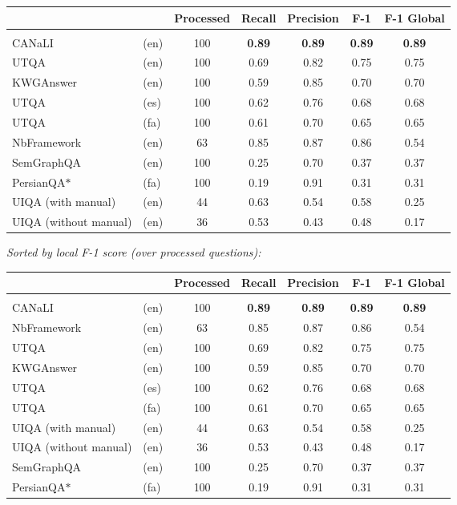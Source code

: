 \documentclass{article}
\begin{document}
\begin{tabular}{llccccc}
& & Processed & Recall & Precision & F-1 & F-1 Global \\
\hline \\[1ex]
CANaLI      & (en) & 100 & \textbf{0.89} & \textbf{0.89} & \textbf{0.89} & \textbf{0.89} \\
UTQA        & (en) & 100 & 0.69 & 0.82 & 0.75 & 0.75 \\
KWGAnswer   & (en) & 100 & 0.59 & 0.85 & 0.70 & 0.70 \\
UTQA        & (es) & 100 & 0.62 & 0.76 & 0.68 & 0.68 \\
UTQA        & (fa) & 100 & 0.61 & 0.70 & 0.65 & 0.65 \\
NbFramework & (en) & 63 & 0.85 & 0.87 & 0.86 & 0.54 \\
SemGraphQA  & (en) & 100 & 0.25 & 0.70 & 0.37 & 0.37 \\
PersianQA$\ast$ & (fa) & 100 & 0.19 & 0.91 & 0.31 & 0.31 \\
UIQA (with manual) & (en) & 44 & 0.63 & 0.54 & 0.58 & 0.25 \\
UIQA (without manual) & (en) & 36 & 0.53 & 0.43 & 0.48 & 0.17 \\
\end{tabular}

\vspace{.6cm}

\emph{Sorted by local F-1 score (over processed questions):}

\vspace{.6cm}

\begin{tabular}{llccccc}
& & Processed & Recall & Precision & F-1 & F-1 Global \\
\hline \\[1ex]
CANaLI      & (en) & 100 & \textbf{0.89} & \textbf{0.89} & \textbf{0.89} & \textbf{0.89} \\
NbFramework & (en) & 63 & 0.85 & 0.87 & 0.86 & 0.54 \\
UTQA        & (en) & 100 & 0.69 & 0.82 & 0.75 & 0.75 \\
KWGAnswer   & (en) & 100 & 0.59 & 0.85 & 0.70 & 0.70 \\
UTQA        & (es) & 100 & 0.62 & 0.76 & 0.68 & 0.68 \\
UTQA        & (fa) & 100 & 0.61 & 0.70 & 0.65 & 0.65 \\
UIQA (with manual) & (en) & 44 & 0.63 & 0.54 & 0.58 & 0.25 \\
UIQA (without manual) & (en) & 36 & 0.53 & 0.43 & 0.48 & 0.17 \\
SemGraphQA  & (en) & 100 & 0.25 & 0.70 & 0.37 & 0.37 \\
PersianQA$\ast$ & (fa) & 100 & 0.19 & 0.91 & 0.31 & 0.31 \\
\end{tabular}
\end{document}
